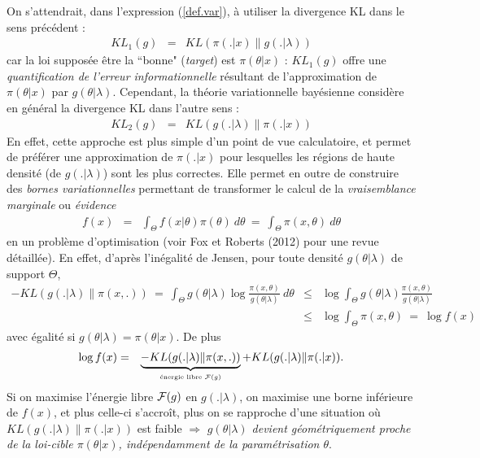 On s'attendrait, dans l'expression (\ref{def.var}), à utiliser la divergence KL dans le sens précédent :
\begin{eqnarray*}
KL_1(g) & = &  KL\left( \pi(.|x) \| g(.|\lambda) \right)
\end{eqnarray*}
car la loi supposée être la ``bonne" (\textit{target}) est   $\pi(\theta|x)$ : $KL_1(g)$ offre une \emph{quantification de l'erreur informationnelle} résultant de l'approximation de $\pi(\theta|x)$ par $g(\theta|\lambda)$. Cependant, la théorie variationnelle bayésienne considère en général la divergence KL dans l'autre sens :
\begin{eqnarray*}
KL_2(g) & = &  KL\left( g(.|\lambda) \| \pi(.|x) \right)
\end{eqnarray*}
En effet, cette approche  est plus simple d'un point de vue calculatoire, et permet de préférer une approximation de $\pi(.|x)$ pour lesquelles les régions de haute densité (de $g(.|\lambda)$) sont les plus correctes. Elle permet en outre de construire des \emph{bornes variationnelles} permettant de transformer le calcul de la \emph{vraisemblance marginale} ou {\it évidence}
\begin{eqnarray*}
f(x) & = & \int_{\Theta} f(x|\theta) \pi(\theta) \ d\theta \ = \ \int_{\Theta} \pi(x,\theta) \ d\theta
\end{eqnarray*}
en un problème d'optimisation (voir Fox et Roberts (2012) pour une revue détaillée). En effet, d'après l'inégalité de Jensen, pour toute densité $g(\theta|\lambda)$ de support $\Theta$,
\begin{eqnarray*}
- KL(g(.|\lambda) \| \pi(x,.)) \ = \ \int_{\Theta} g(\theta|\lambda) \log \frac{\pi(x,\theta) }{g(\theta|\lambda)} \ d\theta & \leq & \log \int_{\Theta} g(\theta|\lambda) \frac{\pi(x,\theta) }{g(\theta|\lambda)} \\
& \leq  & \log \int_{\Theta}  \pi(x,\theta)  \ =  \ \log f(x)
\end{eqnarray*}
avec égalité si $g(\theta|\lambda)=\pi(\theta|x)$.  %
De plus
\begin{eqnarray*}
\log f(x) & = & \underbrace{- KL(g(.|\lambda) \| \pi(x,.))}_{\text{\tiny énergie libre ${\cal{F}}(g)$}} + KL(g(.|\lambda) \| \pi(.|x)).
\end{eqnarray*}
Si on maximise l'énergie libre ${\cal{F}}(g)$ en $g(.|\lambda)$, on maximise une borne inférieure de $f(x)$, et plus celle-ci s'accroît, plus on se rapproche d'une situation où   $KL(g(.|\lambda) \| \pi(.|x))$ est faible $\Rightarrow$ \emph{$g(\theta|\lambda)$ devient géométriquement proche de la loi-cible $\pi(\theta|x)$, indépendamment de la paramétrisation $\theta$}. \\

